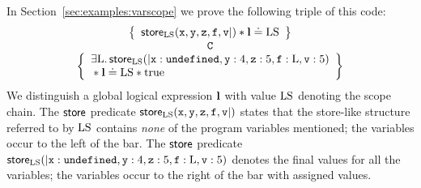 \documentclass{article}
\begin{document}
In Section~\ref{sec:examples:varscope} we prove the following triple of this code:
        \[\begin{array}{c}
                \left\{\begin{array}{l}

                        \store_{\V{LS}}(\js{x},\js{y},\js{z},\js{f},\js{v}|)\sep\ls\doteq\V{LS}
                \end{array}\right\}\\
                \js C\\
                \left\{\begin{array}{l}
                        \exists\V{L}\st
                        \store_{\V{LS}}(|\js{x}:\und,\js{y}:4,\js{z}:5,\js{f}:\V{L},\js{v}:5)\\
                        {}\sep\ls\doteq\V{LS}
                        \sep\true\\
                \end{array}\right\} \\
        \end{array}\]
We   distinguish a  global logical 
expression $\ls$ with  value  $\V{LS}$ denoting
the scope chain. 
The 
 $\store$ predicate  $\store_{\V{LS}}(\js{x},\js{y},\js{z},\js{f},\js{v}|)$
states that the store-like structure referred to by $\V{LS}$ contains 
{\em none} of the program variables mentioned; the variables occur to the left of the bar.
The  $\store$ predicate
$  \store_{\V{LS}}(|\js{x}:\und,\js{y}:4,\js{z}:5,\js{f}:\V{L},\js{v}:5)$  denotes 
the final values for all the variables; the variables occur to  the  right of the bar with assigned values. 
\end{document}

